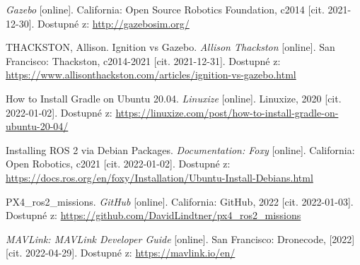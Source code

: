 \begin{thebibliography}{99}
\textit{Gazebo} [online]. California: Open Source Robotics Foundation, c2014 [cit. 2021-12-30]. Dostupné z: \href{http://gazebosim.org/}{http://gazebosim.org/}

THACKSTON, Allison. Ignition vs Gazebo. \textit{Allison Thackston} [online]. San Francisco: Thackston, c2014-2021 [cit. 2021-12-31]. Dostupné z: \href{https://www.allisonthackston.com/articles/ignition-vs-gazebo.html}{https://www.allisonthackston.com/articles/ignition-vs-gazebo.html}


How to Install Gradle on Ubuntu 20.04. \textit{Linuxize} [online]. Linuxize, 2020 [cit. 2022-01-02]. Dostupné z: \href{https://linuxize.com/post/how-to-install-gradle-on-ubuntu-20-04/}{https://linuxize.com/post/how-to-install-gradle-on-ubuntu-20-04/}



Installing ROS 2 via Debian Packages. \textit{Documentation: Foxy} [online]. California: Open Robotics, c2021 [cit. 2022-01-02]. Dostupné z: \href{https://docs.ros.org/en/foxy/Installation/Ubuntu-Install-Debians.html}{https://docs.ros.org/en/foxy/Installation/Ubuntu-Install-Debians.html}


PX4\_ros2\_missions. \textit{GitHub} [online]. California: GitHub, 2022 [cit. 2022-01-03]. Dostupné z: \href{https://github.com/DavidLindtner/px4\_ros2\_missions}{https://github.com/DavidLindtner/px4\_ros2\_missions}

\textit{MAVLink: MAVLink Developer Guide} [online]. San Francisco: Dronecode, [2022] [cit. 2022-04-29]. Dostupné z: \href{https://mavlink.io/en/}{https://mavlink.io/en/}



\end{thebibliography}
